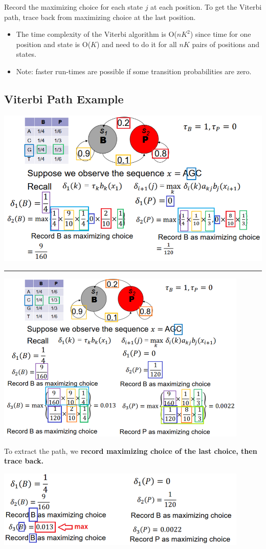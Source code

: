 \documentclass[10pt]{article}
\begin{document}
Record the maximizing choice for each state $j$ at each position.  To get the Viterbi path, trace back from maximizing choice at the last position.
\begin{itemize}
	\item The time complexity of the Viterbi algorithm is O($nK^2$) since time for one position and state is O($K$) and need to do it for all $nK$ pairs of positions and states.
	\item Note: faster run-times are possible if some transition probabilities are zero.
\end{itemize}

\subsection*{Viterbi Path Example}
\begin{center} 
	\includegraphics*[width=\textwidth]{W9_27.png} \\
    \rule{\textwidth}{2pt}
    \includegraphics*[width=0.9\textwidth]{W9_28.png} \\
\end{center}
To extract the path, we \textbf{record maximizing choice of the last choice, then trace back.}
\begin{center} 
	\includegraphics*[width=0.9\textwidth]{W9_29.png} 
\end{center}
\end{document}
